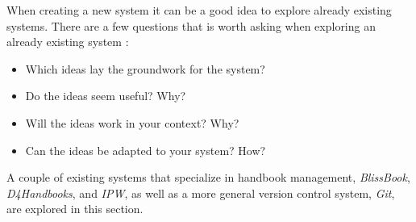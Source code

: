 When creating a new system it can be a good idea to explore already existing systems.
There are a few questions that is worth asking when exploring an already existing system \citep[p.~33]{Rod-Aalborg}:

\begin{itemize}
  \item Which ideas lay the groundwork for the system?
  \item Do the ideas seem useful? Why?
  \item Will the ideas work in your context? Why?
  \item Can the ideas be adapted to your system? How?
\end{itemize}  

A couple of existing systems that specialize in handbook management, \textit{BlissBook}, \textit{D4Handbooks}, and \textit{IPW}, as well as a more general version control system, \textit{Git}, are explored in this section.
